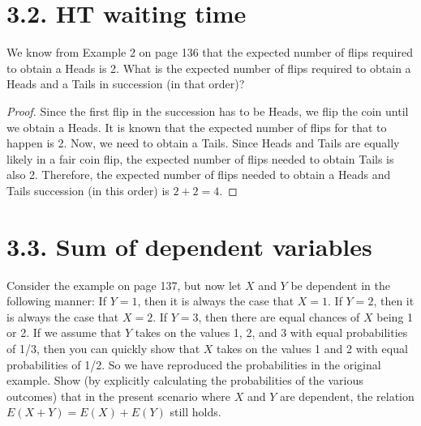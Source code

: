 \section*{3.2. HT waiting time}
We know from Example 2 on page 136 that the expected number of flips required to obtain a Heads is 2. 
What is the expected number of flips required to obtain a Heads and a Tails in succession (in that order)?

\vspace{1em}

\begin{proof}
    Since the first flip in the succession has to be Heads, we flip the coin until we obtain a Heads. 
    It is known that the expected number of flips for that to happen is 2. Now, we need to obtain a 
    Tails. Since Heads and Tails are equally likely in a fair coin flip, the expected number of flips
    needed to obtain Tails is also 2. Therefore, the expected number of flips needed to obtain a 
    Heads and Tails succession (in this order) is $2 + 2 = 4$.
\end{proof}

\section*{3.3. Sum of dependent variables}
Consider the example on page 137, but now let $X$ and $Y$ be dependent in the following
manner: If $Y = 1$, then it is always the case that $X = 1$. If  $Y = 2$, then it is always the
case that $X = 2$. If $Y = 3$, then there are equal chances of $X$ being 1 or 2. If we assume that 
$Y$ takes on the values 1, 2, and 3 with equal probabilities of 1/3, then you can quickly show
that $X$ takes on the values 1 and 2 with equal probabilities of 1/2. So we have reproduced
the probabilities in the original example. Show (by explicitly calculating the probabilities of
the various outcomes) that in the present scenario where $X$ and $Y$ are dependent, the relation
$E(X + Y) = E(X) + E(Y)$ still holds.

\vspace{1em}

